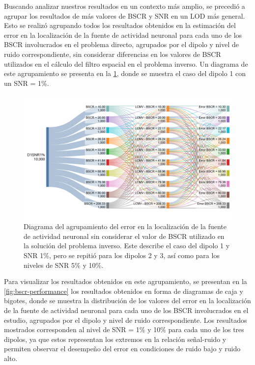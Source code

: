 Buscando analizar nuestros resultados en un contexto más amplio, se precedió a agrupar los resultados de más valores de BSCR y SNR en un LOD más general.
Esto se realizó agrupando todos los resultados obtenidos en la estimación del error en la localización de la fuente de actividad neuronal para cada uno de los BSCR involucrados en el problema directo, agrupados por el dipolo y nivel de ruido correspondiente, sin considerar diferencias en los valores de BSCR utilizados en el cálculo del filtro espacial en el problema inverso.
Un diagrama de este agrupamiento se presenta en la \cref{fig:sankey-boxplots}, donde se muestra el caso del dipolo 1 con un SNR = 1\%.

\begin{figure}[t]
    \centering
    \includegraphics[width=\textwidth]{gfx/sankey-boxplots.png}
    \caption{Diagrama del agrupamiento del error en la localización de la fuente de actividad neuronal sin considerar el valor de BSCR utilizado en la solución del problema inverso. Este describe el caso del dipolo 1 y SNR 1\%, pero se repitió para los dipolos 2 y 3, así como para los niveles de SNR 5\% y 10\%.}
    \label{fig:sankey-boxplots}
\end{figure}

Para visualizar los resultados obtenidos en este agrupamiento, se presentan en la \cref{fig:bscr-performance} los resultados obtenidos en forma de diagramas de caja y bigotes, donde se muestra la distribución de los valores del error en la localización de la fuente de actividad neuronal para cada uno de los BSCR involucrados en el estudio, agrupados por el dipolo y nivel de ruido correspondiente.
Los resultados mostrados corresponden al nivel de SNR = 1\% y 10\% para cada uno de los tres dipolos, ya que estos representan los extremos en la relación señal-ruido y permiten observar el desempeño del error en condiciones de ruido bajo y ruido alto.

